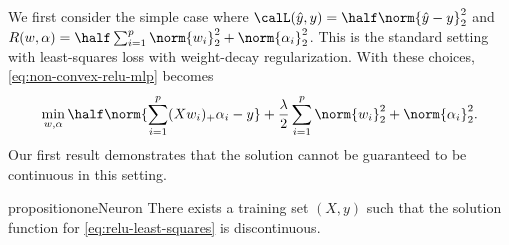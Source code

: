 
We first consider the simple case where \( \calL(\hat y, y) = \half \norm{\hat y - y}_2^2 \) and \( R(w, \alpha) = \half \sum_{i = 1}^p \norm{w_i}_2^2 + \norm{\alpha_i}_2^2 \).
This is the standard setting with least-squares loss with weight-decay regularization.
With these choices, \cref{eq:non-convex-relu-mlp} becomes
\begin{equation}
	\label{eq:relu-least-squares}
	\min_{w, \alpha} \half \norm{\sum_{i=1}^p (X w_i)_+ \alpha_i - y} + \frac{\lambda}{2} \sum_{i = 1}^p \norm{w_i}_2^2 + \norm{\alpha_i}_2^2.
\end{equation}
Our first result demonstrates that the solution cannot be guaranteed to be continuous in this setting.
\begin{restatable}{proposition}{oneNeuron}\label{prop:one-neuron}
	There exists a training set \( (X, y) \) such that the solution function for \cref{eq:relu-least-squares} is discontinuous.
\end{restatable}
